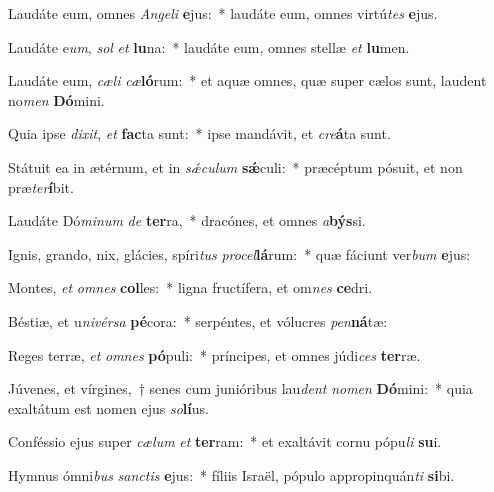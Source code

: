 \item Laudáte eum, omnes \textit{An}\textit{ge}\textit{li} \textbf{e}jus:~* laudáte eum, omnes virtú\textit{tes} \textbf{e}jus.
\item Laudáte e\textit{um}, \textit{sol} \textit{et} \textbf{lu}na:~* laudáte eum, omnes stellæ \textit{et} \textbf{lu}men.
\item Laudáte eum, \textit{cæ}\textit{li} \textit{cæ}\textbf{ló}rum:~* et aquæ omnes, quæ super cælos sunt, laudent no\textit{men} \textbf{Dó}mini.
\item Quia ipse \textit{di}\textit{xit}, \textit{et} \textbf{fac}ta sunt:~* ipse mandávit, et \textit{cre}\textbf{á}ta sunt.
\item Státuit ea in ætérnum, et in \textit{sǽ}\textit{cu}\textit{lum} \textbf{sǽ}culi:~* præcéptum pósuit, et non præ\textit{ter}\textbf{í}bit.
\item Laudáte Dó\textit{mi}\textit{num} \textit{de} \textbf{ter}ra,~* dracónes, et omnes \textit{a}\textbf{býs}si.
\item Ignis, grando, nix, glácies, spíri\textit{tus} \textit{pro}\textit{cel}\textbf{lá}rum:~* quæ fáciunt ver\textit{bum} \textbf{e}jus:
\item Montes, \textit{et} \textit{om}\textit{nes} \textbf{col}les:~* ligna fructífera, et om\textit{nes} \textbf{ce}dri.
\item Béstiæ, et u\textit{ni}\textit{vér}\textit{sa} \textbf{pé}cora:~* serpéntes, et vólucres \textit{pen}\textbf{ná}tæ:
\item Reges terræ, \textit{et} \textit{om}\textit{nes} \textbf{pó}puli:~* príncipes, et omnes júdi\textit{ces} \textbf{ter}ræ.
\item Júvenes, et vírgines,~† senes cum junióribus lau\textit{dent} \textit{no}\textit{men} \textbf{Dó}mini:~* quia exaltátum est nomen ejus \textit{so}\textbf{lí}us.
\item Conféssio ejus super \textit{cæ}\textit{lum} \textit{et} \textbf{ter}ram:~* et exaltávit cornu pópu\textit{li} \textbf{su}i.
\item Hymnus ómni\textit{bus} \textit{sanc}\textit{tis} \textbf{e}jus:~* fíliis Israël, pópulo appropinquán\textit{ti} \textbf{si}bi.
